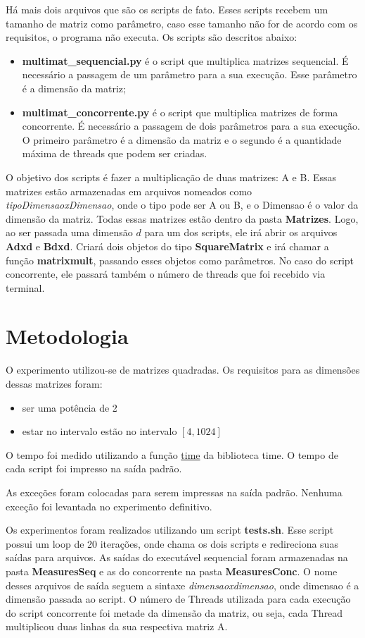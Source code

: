 \documentclass[12pt]{article}
\begin{document}
Há mais dois arquivos que são os scripts de fato. Esses scripts recebem um tamanho de matriz como parâmetro, caso esse tamanho não for de acordo com os requisitos, o programa não executa. Os scripts são descritos abaixo:
\begin{itemize}
\item \textbf{multimat\_sequencial.py} é o script que multiplica matrizes sequencial. É necessário a passagem de um parâmetro para a sua execução. Esse parâmetro é a dimensão da matriz;
\item \textbf{multimat\_concorrente.py} é o script que multiplica matrizes de forma concorrente. É necessário a passagem de dois parâmetros para a sua execução. O primeiro parâmetro é a dimensão da matriz e o segundo é a quantidade máxima de threads que podem ser criadas.
\end{itemize}
O objetivo dos scripts é fazer a multiplicação de duas matrizes: A e B. Essas matrizes estão armazenadas em arquivos nomeados como \textit{tipoDimensaoxDimensao}, onde o tipo pode ser A ou B, e o Dimensao é o valor da dimensão da matriz. Todas essas matrizes estão dentro da pasta \textbf{Matrizes}. Logo, ao ser passada uma dimensão $d$ para um dos scripts, ele irá abrir os arquivos \textbf{Adxd} e \textbf{Bdxd}. Criará dois objetos do tipo \textbf{SquareMatrix} e irá chamar a função \textbf{matrixmult}, passando esses objetos como parâmetros. No caso do script concorrente, ele passará também o número de threads que foi recebido via terminal.

\section{Metodologia}
O experimento utilizou-se de matrizes quadradas. Os requisitos para as dimensões dessas matrizes foram: 
\begin{itemize}
	\item ser uma potência de 2
	\item estar no intervalo estão no intervalo $[4,1024]$
\end{itemize}

O tempo foi medido utilizando a função \href{https://docs.python.org/3/library/time.html#time.time}{time} da biblioteca time. O tempo de cada script foi impresso na saída padrão.

As exceções foram colocadas para serem impressas na saída padrão. Nenhuma exceção foi levantada no experimento definitivo.

Os experimentos foram realizados utilizando um script \textbf{tests.sh}. Esse script possui um loop de 20 iterações, onde chama os dois scripts e redireciona suas saídas para arquivos. As saídas do executável sequencial foram armazenadas na pasta \textbf{MeasuresSeq} e as do concorrente na pasta \textbf{MeasuresConc}. O nome desses arquivos de saída seguem a sintaxe \textit{dimensaoxdimensao}, onde dimensao é a dimensão passada ao script. O número de Threads utilizada para cada execução do script concorrente foi metade da dimensão da matriz, ou seja, cada Thread multiplicou duas linhas da sua respectiva matriz A.
\end{document}
